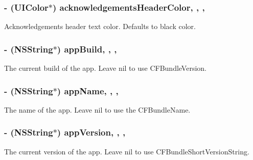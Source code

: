 \subsubsection[{acknowledgements\+Header\+Color}]{\setlength{\rightskip}{0pt plus 5cm}-\/ (U\+I\+Color$\ast$) acknowledgements\+Header\+Color\hspace{0.3cm}{\ttfamily [read]}, {\ttfamily [write]}, {\ttfamily [nonatomic]}, {\ttfamily [strong]}}\label{interface_r_f_about_view_controller_ab45856e8b46beec498fc4f7df02e893f}
Acknowledgements header text color. Defaults to black color. \hypertarget{interface_r_f_about_view_controller_ab5c2e854a7b49b2a69eb7fa4ad83c687}{}
\subsubsection[{app\+Build}]{\setlength{\rightskip}{0pt plus 5cm}-\/ (N\+S\+String$\ast$) app\+Build\hspace{0.3cm}{\ttfamily [read]}, {\ttfamily [write]}, {\ttfamily [nonatomic]}, {\ttfamily [strong]}}\label{interface_r_f_about_view_controller_ab5c2e854a7b49b2a69eb7fa4ad83c687}
The current build of the app. Leave nil to use C\+F\+Bundle\+Version. \hypertarget{interface_r_f_about_view_controller_abe9bbad453dbb7512cbb31f70e8306f4}{}
\subsubsection[{app\+Name}]{\setlength{\rightskip}{0pt plus 5cm}-\/ (N\+S\+String$\ast$) app\+Name\hspace{0.3cm}{\ttfamily [read]}, {\ttfamily [write]}, {\ttfamily [nonatomic]}, {\ttfamily [strong]}}\label{interface_r_f_about_view_controller_abe9bbad453dbb7512cbb31f70e8306f4}
The name of the app. Leave nil to use the C\+F\+Bundle\+Name. \hypertarget{interface_r_f_about_view_controller_ab2f19b0299165e723a02dd2d0bb1b987}{}
\subsubsection[{app\+Version}]{\setlength{\rightskip}{0pt plus 5cm}-\/ (N\+S\+String$\ast$) app\+Version\hspace{0.3cm}{\ttfamily [read]}, {\ttfamily [write]}, {\ttfamily [nonatomic]}, {\ttfamily [strong]}}\label{interface_r_f_about_view_controller_ab2f19b0299165e723a02dd2d0bb1b987}
The current version of the app. Leave nil to use C\+F\+Bundle\+Short\+Version\+String. \hypertarget{interface_r_f_about_view_controller_afd81a5d5de125276ca18ebe3be0c69e1}{}
